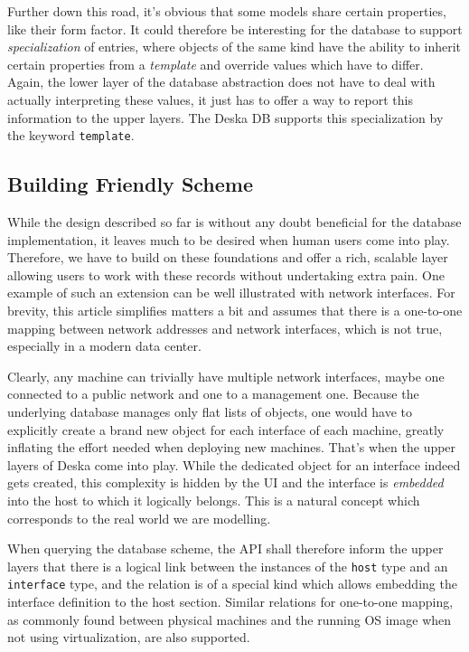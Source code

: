 \documentclass[a4paper]{jpconf}
\begin{document}
Further down this road, it's obvious that some models share certain properties, like their form factor.  It could therefore be
interesting for the database to support {\em specialization} of entries, where objects of the same kind have the ability to inherit
certain properties from a {\em template} and override values which have to differ.  Again, the lower layer of the database abstraction
does not have to deal with actually interpreting these values, it just has to offer a way to report this information to the upper
layers.  The Deska DB supports this specialization by the keyword {\tt template}.

\subsection{Building Friendly Scheme}

While the design described so far is without any doubt beneficial for the database implementation, it leaves much to be desired when
human users come into play.  Therefore, we have to build on these foundations and offer a rich, scalable layer allowing users to work
with these records without undertaking extra pain.  One example of such an extension can be well illustrated with network interfaces.
For brevity, this article simplifies matters a bit and assumes that there is a one-to-one mapping between network addresses and network
interfaces, which is not true, especially in a modern data center.

Clearly, any machine can trivially have multiple network interfaces, maybe one connected to a public network and one to a management
one.  Because the underlying database manages only flat lists of objects, one would have to explicitly create a brand new object for
each interface of each machine, greatly inflating the effort needed when deploying new machines.  That's when the upper layers of Deska
come into play.  While the dedicated object for an interface indeed gets created, this complexity is hidden by the UI and the interface
is {\em embedded} into the host to which it logically belongs.  This is a natural concept which corresponds to the real world we are
modelling.

When querying the database scheme, the API shall therefore inform the upper layers that there is a logical link between the instances
of the {\tt host} type and an {\tt interface} type, and the relation is of a special kind which allows embedding the interface
definition to the host section.  Similar relations for one-to-one mapping, as commonly found between physical machines and the running
OS image when not using virtualization, are also supported.
\end{document}
